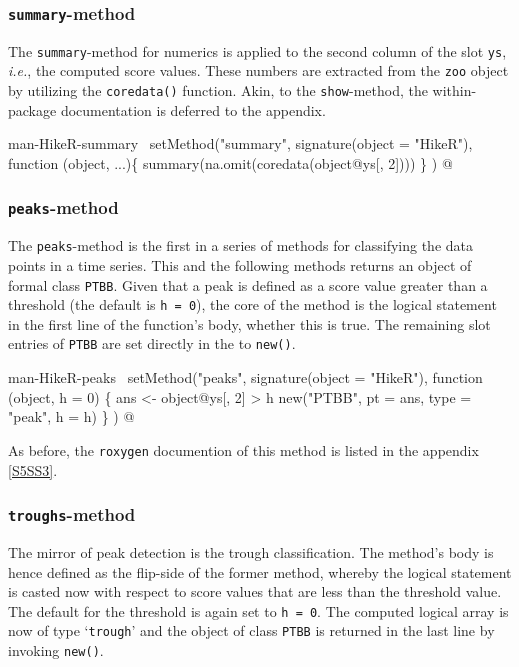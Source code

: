 \documentclass[a4paper]{article}
\begin{document}
\subsubsection{\texttt{summary}-method}
The \verb?summary?-method for numerics is applied to the second column of the
slot \verb?ys?, \emph{i.e.}, the computed score values. These numbers are
extracted from the \verb?zoo? object by utilizing the \verb?coredata()?
function. Akin, to the \verb?show?-method, the within-package documentation
is deferred to the appendix.

\nwenddocs{}\endmoddef
\LA{}man-HikeR-summary~{\nwtagstyle{}}\RA{}
setMethod("summary",
          signature(object = "HikeR"),
          function (object, ...)\{
              summary(na.omit(coredata(object@ys[, 2])))
          \}
)
\nwendcode{}@

\subsubsection{\texttt{peaks}-method}
The \verb?peaks?-method is the first in a series of methods for
classifying the data points in a time series. This and the following
methods returns an object of formal class \verb?PTBB?. Given that a peak
is defined as a score value greater than a threshold (the default is
\verb?h = 0?), the core of the method is the logical statement in the
first line of the function's body, whether this is true. The remaining
slot entries of \verb?PTBB? are set directly in the to \verb?new()?.

\nwenddocs{}\endmoddef
\LA{}man-HikeR-peaks~{\nwtagstyle{}}\RA{}
setMethod("peaks",
    signature(object = "HikeR"),
    function (object, h = 0) \{
        ans <- object@ys[, 2] > h
        new("PTBB", pt = ans, type = "peak", h = h)
    \}
)
\nwendcode{}@

As before, the \verb?roxygen? documention of this method is listed in the
appendix \ref{S5SS3}.

\subsubsection{\texttt{troughs}-method}
The mirror of peak detection is the trough classification. The
method's body is hence defined as the flip-side of the former method,
whereby the logical statement is casted now with respect to score
values that are less than the threshold value. The default for the
threshold is again set to \verb?h = 0?. The computed logical array is now
of type `\verb?trough?' and the object of class \verb?PTBB? is returned in
the last line by invoking \verb?new()?.
\end{document}
